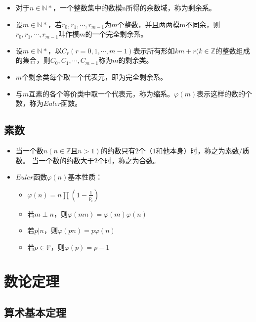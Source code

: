 \documentclass{beamer}
\begin{document}
\begin{frame}
\begin{itemize}[<+-| alert@+>]
	\item 对于$n \in \mathbb{N*}$，一个整数集中的数模n所得的余数域，称为剩余系。
	\item 设$m \in \mathbb{N*}$，若$r_0,r_1,\cdots,r_{m-1}$为$m$个整数，并且两两模m不同余，则$r_0,r_1,\cdots,r_{m-1}$叫作模$m$的一个完全剩余系。
	\item 设$m \in \mathbb{N*}$，以$C_r(r=0,1,\cdots,m-1)$表示所有形如$km+r(k\in \mathbb{Z}$的整数组成的集合，则$C_0,C_1,\cdots,C_{m-1}$称为$m$的剩余类。
	\item $m$个剩余类每个取一个代表元，即为完全剩余系。
	\item 与$m$互素的各个等价类中取一个代表元，称为缩系。$\varphi(m)$表示这样的数的个数，称为$Euler$函数。
\end{itemize}
\end{frame}

\subsection{素数}

\begin{frame}
\begin{itemize}[<+-| alert@+>]
	\item 当一个数$n(n \in \mathbb{Z}且n > 1)$的约数只有$2$个（$1$和他本身）时，称之为素数/质数。 当一个数的约数大于$2$个时，称之为合数。
	\item $Euler$函数$\varphi(n)$基本性质：
		\begin{itemize}[<+-| alert@+>]
			\item $\varphi(n)=n\prod(1-\frac{1}{p_i})$
			\item 若$m\perp n$，则$\varphi(mn)=\varphi(m)\varphi(n)$
			\item 若$p|n$，则$\varphi(pn)=p\varphi(n)$
			\item 若$p \in \mathbb{P}$，则$\varphi(p)=p-1$
		\end{itemize}
\end{itemize}
\end{frame}

\section{数论定理}

\subsection{算术基本定理}
\end{document}
